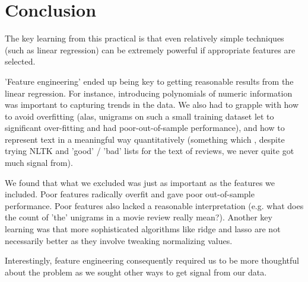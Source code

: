 \documentclass[11pt, oneside]{article}   	%
\begin{document}
\section*{Conclusion}
The key learning from this practical is that even relatively simple techniques (such as linear regression) can be extremely powerful if appropriate features are selected. 

'Feature engineering' ended up being key to getting reasonable results from the linear regression. For instance, introducing polynomials of numeric information was important to capturing trends in the data. We also had to grapple with how to avoid overfitting (alas, unigrams on such a small training dataset let to significant over-fitting and had poor-out-of-sample performance), and how to represent text in a meaningful way quantitatively (something which , despite trying NLTK and 'good' / 'bad' lists for the text of reviews, we never quite got much signal from).

We found that what we excluded was just as important as the features we included. Poor features radically overfit and gave poor out-of-sample performance. Poor features also lacked a reasonable interpretation (e.g. what does the count of 'the' unigrams in a movie review really mean?). Another key learning was that more sophisticated algorithms like ridge and lasso are not necessarily better as they involve tweaking normalizing values.

Interestingly, feature engineering consequently required us to be more thoughtful about the problem as we sought other ways to get signal from our data. 
\end{document}
